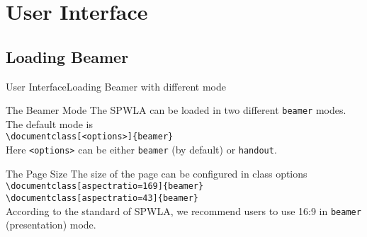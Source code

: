 \documentclass[10pt,xcolor={dvipsnames},aspectratio=169]{beamer}
\begin{document}
\section{User Interface}
\subsection{Loading Beamer}
\begin{frame}{User Interface}{Loading Beamer with different mode}
  \vspace{-0.5em}
  \begin{block}{The Beamer Mode}
    \small
    The SPWLA can be loaded in two different \texttt{beamer} modes. The default mode is\\
    {\tt \textbackslash documentclass[<options>]\{beamer\}}\\
    Here \texttt{<options>} can be either \texttt{beamer} (by default) or \texttt{handout}.
  \end{block}
  \begin{block}{The Page Size}
    \small
    The size of the page can be configured in class options\\
    {\tt \textbackslash documentclass[aspectratio=169]\{beamer\}}\\
    {\tt \textbackslash documentclass[aspectratio=43]\{beamer\}}\\
    According to the standard of SPWLA, we recommend users to use 16:9 in \texttt{beamer} (presentation) mode.
  \end{block}
\end{frame}


\end{document}
